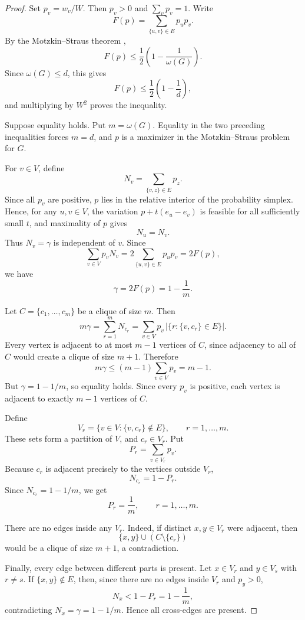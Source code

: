 \documentclass[11pt]{article}
\numberwithin{equation}{section}
\begin{document}
\begin{proof}
Set $p_v=w_v/W$. Then $p_v>0$ and $\sum_v p_v=1$. Write
\[
        F(p)=\sum_{\{u,v\}\in E}p_up_v.
\]
By the Motzkin--Straus theorem \cite{MotzkinStraus},
\[
        F(p)\le \frac12\left(1-\frac1{\omega(G)}\right).
\]
Since $\omega(G)\le d$, this gives
\[
        F(p)\le \frac12\left(1-\frac1d\right),
\]
and multiplying by $W^2$ proves the inequality.

Suppose equality holds. Put $m=\omega(G)$. Equality in the two preceding
inequalities forces $m=d$, and $p$ is a maximizer in the Motzkin--Straus
problem for $G$.

For $v\in V$, define
\[
        N_v=\sum_{\{v,z\}\in E}p_z.
\]
Since all $p_v$ are positive, $p$ lies in the relative interior of the
probability simplex. Hence, for any $u,v\in V$, the variation
$p+t(e_u-e_v)$ is feasible for all sufficiently small $t$, and maximality of
$p$ gives
\[
        N_u=N_v.
\]
Thus $N_v=\gamma$ is independent of $v$. Since
\[
        \sum_{v\in V}p_vN_v
        =2\sum_{\{u,v\}\in E}p_up_v
        =2F(p),
\]
we have
\[
        \gamma=2F(p)=1-\frac1m.
\]

Let $C=\{c_1,\ldots,c_m\}$ be a clique of size $m$. Then
\[
        m\gamma
        =\sum_{r=1}^m N_{c_r}
        =\sum_{v\in V}p_v\,|\{r:\{v,c_r\}\in E\}|.
\]
Every vertex is adjacent to at most $m-1$ vertices of $C$, since adjacency to
all of $C$ would create a clique of size $m+1$. Therefore
\[
        m\gamma\le (m-1)\sum_{v\in V}p_v=m-1.
\]
But $\gamma=1-1/m$, so equality holds. Since every $p_v$ is positive, each
vertex is adjacent to exactly $m-1$ vertices of $C$.

Define
\[
        V_r=\{v\in V:\{v,c_r\}\notin E\},\qquad r=1,\ldots,m.
\]
These sets form a partition of $V$, and $c_r\in V_r$. Put
\[
        P_r=\sum_{v\in V_r}p_v.
\]
Because $c_r$ is adjacent precisely to the vertices outside $V_r$,
\[
        N_{c_r}=1-P_r.
\]
Since $N_{c_r}=1-1/m$, we get
\[
        P_r=\frac1m,\qquad r=1,\ldots,m.
\]

There are no edges inside any $V_r$. Indeed, if distinct $x,y\in V_r$ were
adjacent, then
\[
        \{x,y\}\cup (C\setminus\{c_r\})
\]
would be a clique of size $m+1$, a contradiction.

Finally, every edge between different parts is present. Let $x\in V_r$ and
$y\in V_s$ with $r\ne s$. If $\{x,y\}\notin E$, then, since there are no
edges inside $V_r$ and $p_y>0$,
\[
        N_x<1-P_r=1-\frac1m,
\]
contradicting $N_x=\gamma=1-1/m$. Hence all cross-edges are present.


\end{proof}
\end{document}
